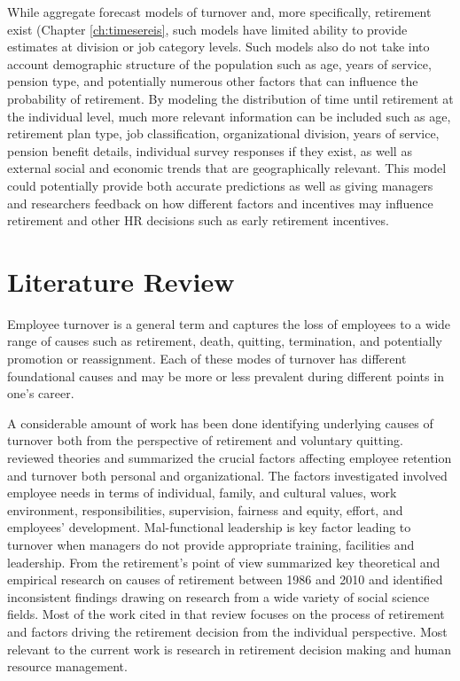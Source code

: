 While aggregate forecast models of turnover and, more specifically, retirement exist (Chapter \ref{ch:timesereis}, such models have limited ability to provide estimates at division or job category levels.  Such models also do not take into account demographic structure of the population such as age, years of service, pension type, and potentially numerous other factors that can influence the probability of retirement. By modeling the distribution of time until retirement at the individual level, much more relevant information can be included such as age, retirement plan type, job classification, organizational division, years of service, pension benefit details, individual survey responses if they exist, as well as external social and economic trends that are geographically relevant. This model could potentially provide both accurate predictions as well as giving managers and researchers feedback on how different factors and incentives may influence retirement and other HR decisions such as early retirement incentives.

\section{Literature Review}

Employee turnover is a general term and captures the loss of employees to a wide range of causes such as retirement, death, quitting, termination, and potentially promotion or reassignment. Each of these modes of turnover has different foundational causes and may be more or less prevalent during different points in one's career.

A considerable amount of work has been done identifying underlying causes of turnover both from the perspective of retirement and voluntary quitting. \citet{rainlall2004} reviewed theories and summarized the crucial factors affecting employee retention and turnover both personal and organizational.  The factors investigated involved employee needs in terms of individual, family, and cultural values, work environment, responsibilities, supervision, fairness and equity, effort, and employees' development.  Mal-functional leadership is key factor leading to turnover when managers do not provide appropriate training, facilities and leadership. From the retirement's point of view  \citet{Wang2010} summarized key theoretical and empirical research on causes of retirement between 1986 and 2010 and identified inconsistent findings drawing on research from a wide variety of social science fields. Most of the work cited in that review focuses on the process of retirement and factors driving the retirement decision from the individual perspective. Most relevant to the current work is research in retirement decision making and human resource management.

